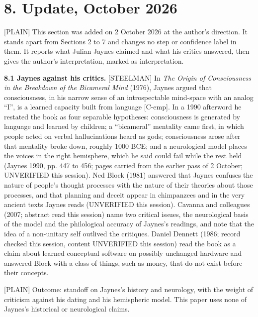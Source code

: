 \documentclass[11pt]{article}
\newcommand{\register}[1]{{\ttfamily\small #1}}
\begin{document}
\section*{8. Update, October 2026}

\register{[PLAIN]} This section was added on 2 October 2026 at the author's direction. It stands apart from Sections 2 to 7 and changes no step or confidence label in them. It reports what Julian Jaynes claimed and what his critics answered, then gives the author's interpretation, marked as interpretation.

\textbf{8.1 Jaynes against his critics.} \register{[STEELMAN]} In \emph{The Origin of Consciousness in the Breakdown of the Bicameral Mind} (1976), Jaynes argued that consciousness, in his narrow sense of an introspectable mind-space with an analog ``I'', is a learned capacity built from language [C-emp]. In a 1990 afterword he restated the book as four separable hypotheses: consciousness is generated by language and learned by children; a ``bicameral'' mentality came first, in which people acted on verbal hallucinations heard as gods; consciousness arose after that mentality broke down, roughly 1000 BCE; and a neurological model places the voices in the right hemisphere, which he said could fail while the rest held (Jaynes 1990, pp. 447 to 456; pages carried from the earlier pass of 2 October; UNVERIFIED this session). Ned Block (1981) answered that Jaynes confuses the nature of people's thought processes with the nature of their theories about those processes, and that planning and deceit appear in chimpanzees and in the very ancient texts Jaynes reads (UNVERIFIED this session). Cavanna and colleagues (2007; abstract read this session) name two critical issues, the neurological basis of the model and the philological accuracy of Jaynes's readings, and note that the idea of a non-unitary self outlived the critiques. Daniel Dennett (1986; record checked this session, content UNVERIFIED this session) read the book as a claim about learned conceptual software on possibly unchanged hardware and answered Block with a class of things, such as money, that do not exist before their concepts.

\register{[PLAIN]} Outcome: standoff on Jaynes's history and neurology, with the weight of criticism against his dating and his hemispheric model. This paper uses none of Jaynes's historical or neurological claims.
\end{document}
